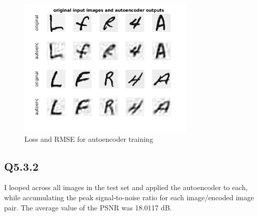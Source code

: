 \documentclass[12pt]{article}
\begin{document}
\begin{figure}[H]
\centering
\includegraphics[page=1,width=0.75\textwidth]{q531_auto}
\caption{ Loss and RMSE for autoencoder training } 
\label{fig:autoencout}
\end{figure}   

\subsection{Q5.3.2}
I looped across all images in the test set and applied the autoencoder to each, while accumulating the peak signal-to-noise ratio for each image/encoded image pair.  The average value of the PSNR was 18.0117 dB.
\end{document}
